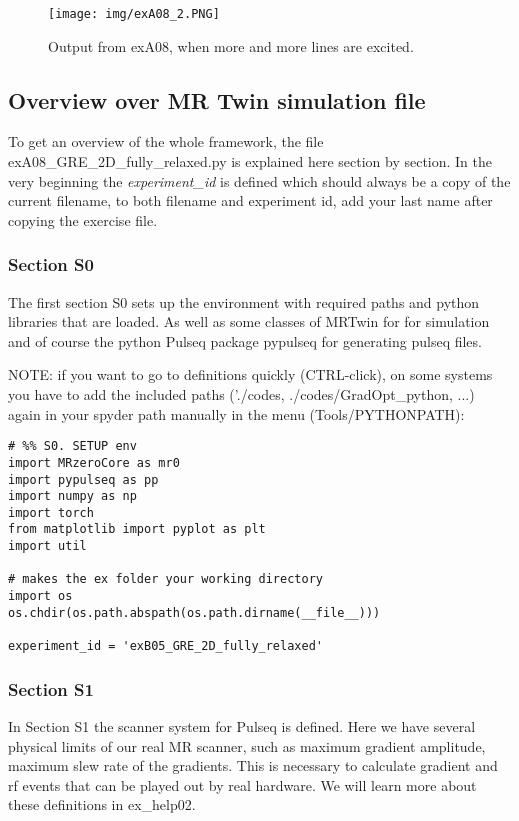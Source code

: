 \documentclass[a4paper,12pt]{extarticle}
\begin{document}
\begin{figure}[!ht] 
\centering
\texttt{[image: img/exA08\_2.PNG]}
\caption{Output from exA08, when more and more lines are excited.} \label{fig:exA09_2}
\end{figure}

\newpage 

\subsection{Overview over MR Twin simulation file}

To get an overview of the whole framework, the file exA08\_GRE\_2D\_fully\_relaxed.py is explained here section by section. In the very beginning the \emph{experiment\_id} is defined which should always be a copy of the current filename, to both filename and experiment id, add your last name after copying the exercise file. 

\subsubsection{Section S0}
The first section S0 sets up the environment with required paths and python libraries that are loaded. As well as some classes of MRTwin for for simulation and of course the python Pulseq package pypulseq for generating pulseq files.

NOTE: if you want to go to definitions quickly (CTRL-click), on some systems you have to add the included paths ('./codes, ./codes/GradOpt\_python, ...)  again in your spyder path manually in the menu (Tools/PYTHONPATH):

\begin{verbatim}
# %% S0. SETUP env
import MRzeroCore as mr0
import pypulseq as pp
import numpy as np
import torch
from matplotlib import pyplot as plt
import util

# makes the ex folder your working directory
import os
os.chdir(os.path.abspath(os.path.dirname(__file__)))

experiment_id = 'exB05_GRE_2D_fully_relaxed'
\end{verbatim}

\subsubsection{Section S1}
In Section S1 the scanner system for Pulseq is defined.
Here we have several physical limits of our real MR scanner, such as maximum gradient amplitude, maximum slew rate of the gradients. This is necessary to calculate gradient and rf events that can be played out by real hardware. We will learn more about these definitions in ex\_help02.
\end{document}
